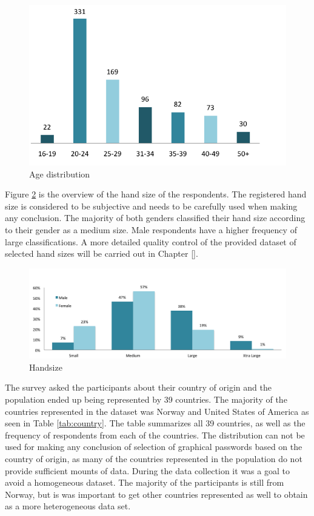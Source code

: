     \begin{figure}[H]
      \centering
      \includegraphics[scale=0.8]{pics/analysis/AgeDist.png}
      \caption{Age distribution}
      \label{fig:ageDistribution}
    \end{figure}

    Figure  \ref{fig:handsizepopulation} is the overview of the hand size of the respondents. The registered hand size is considered to be subjective and needs to be carefully used when making any conclusion. The majority of both genders classified their hand size according to their gender as a medium size. Male respondents have a higher frequency of large classifications. A more detailed quality control of the provided dataset of selected hand sizes will be carried out in Chapter \ref{}.

    \begin{figure}[H]
      \centering
      \includegraphics[width=\textwidth]{pics/infographics/mobilesize.png}
      \caption{Handsize}
      \label{fig:handsizepopulation}
    \end{figure}

    The survey asked the participants about their country of origin and the population ended up being represented by 39 countries. The majority of the countries represented in the dataset was Norway and United States of America as seen in Table \ref{tab:country}. The table summarizes all 39 countries, as well as the frequency of respondents from each of the countries. The distribution can not be used for making any conclusion of selection of graphical passwords based on the country of origin, as many of the countries represented in the population do not provide sufficient mounts of data. During the data collection it was a goal to avoid a homogeneous dataset. The majority of the participants is still from Norway, but is was important to get other countries represented as well to obtain as a more heterogeneous data set.  

